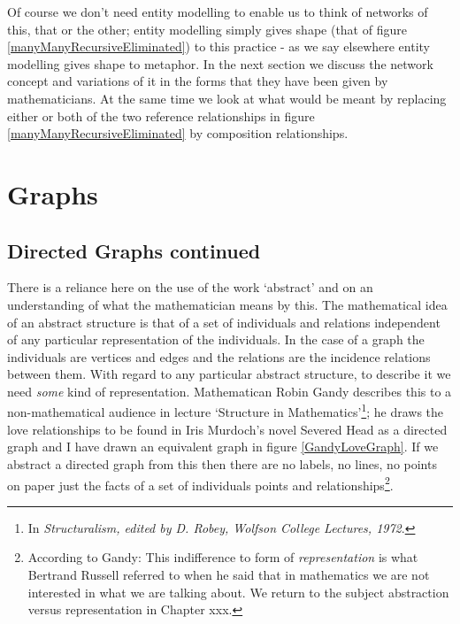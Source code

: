 \noindent Of course we don't need entity modelling to enable us to think of networks of this, that or the other;
entity modelling simply gives shape (that of figure \ref{manyManyRecursiveEliminated}) to this practice -  as we say elsewhere entity modelling gives shape to metaphor. In the next section we discuss the network concept and variations of it in the forms that they have been given by mathematicians. At the same time we look at what would be meant by replacing either or both of the two reference relationships in figure \ref{manyManyRecursiveEliminated} by composition relationships.

\section{Graphs}

\subsection{Directed Graphs continued}


\noindent There is a reliance here on the use of the work `abstract' and on an understanding of what the mathematician means by this. The mathematical idea of an abstract structure is that of a set of individuals and relations independent of any particular representation of the individuals. In the case of a graph the individuals are vertices and edges and the relations are the incidence relations between them. With regard to any particular abstract structure, to describe it we need \textit{some} kind of representation.  Mathematican Robin Gandy describes this to a non-mathematical audience in lecture `Structure in Mathematics'\footnote{In \textit{Structuralism, edited by D. Robey, Wolfson College Lectures, 1972}.}; he draws the love relationships to be found in Iris Murdoch's novel Severed Head as a directed graph and I have drawn an equivalent graph in figure \ref{GandyLoveGraph}.
If we abstract a directed graph from this then there are no labels, no lines, no points on paper just the facts of a set of individuals points and relationships\footnote{According to Gandy: This indifference to form of \textit{representation} is what Bertrand Russell referred to when he said that in mathematics we are not interested in what we are talking about. We return to the subject abstraction versus representation in Chapter xxx.}. 

